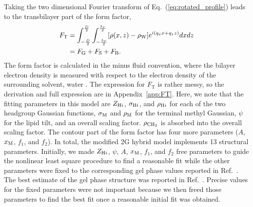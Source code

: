 Taking the two dimensional Fourier transform of Eq.~(\ref{eq:rotated_profile})
leads to the transbilayer part of the form factor,
\begin{align}
  F_\mathrm{T} 
  &= \int_{-\frac{D}{2}}^{\frac{D}{2}} \int_{-\frac{\lambda_r}{2}}^{\frac{\lambda_r}{2}} 
     \mathopen{}\left[ \rho(x,z)-\rho_\mathrm{W} \right]\mathclose{} e^{i(q_xx+q_zz)} dxdz \\
  &= F_\mathrm{G} + F_\mathrm{S} + F_\mathrm{B}.
\end{align}
The form factor is calculated in the minus fluid convention, 
where the bilayer electron density
is measured with respect to the electron density of the surrounding solvent,
water \cite{ref:Worthington73}.
The expression for $F_\mathrm{T}$ is rather messy, so 
the derivation and full expression are in Appendix~\ref{app:FT}. Here, 
we note that
the fitting parameters in this model are $Z_{\mathrm{H}i}$, $\sigma_{\mathrm{H}i}$, and 
$\rho_{\mathrm{H}i}$ for each of the two headgroup Gaussian functions, $\sigma_\mathrm{M}$ and
$\rho_\mathrm{M}$ for
the terminal methyl Gaussian, $\psi$ for
the lipid tilt, and an overall scaling factor. $\rho_\mathrm{CH_2}$ is absorbed into 
the overall scaling factor. The contour part of the 
form factor has four more parameters ($A$, $x_\textrm{M}$, $f_1$, and $f_2$).
In total, the modified 2G hybrid model implements 13 structural parameters.
Initially, we made $Z_{\mathrm{H}i}$, $\psi$, $A$, $x_\textrm{M}$, $f_1$, and $f_2$ free 
parameters
to guide the nonlinear least square procedure to find a reasonable fit
while the other parameters were fixed to the corresponding gel phase values 
reported in Ref.~\cite{ref:Wiener89}. 
The best estimate of the gel phase structure was reported in
Ref.~\cite{Tristram-Nagle02}. Precise values for the fixed parameters
were not important because we then freed those parameters to find the best fit
once a reasonable initial fit was obtained.  

